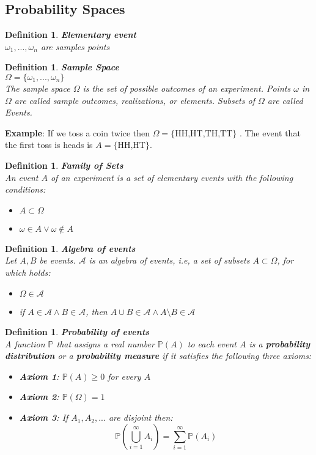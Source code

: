 \documentclass[twoside]{article}
\newtheorem{definition}[theorem]{Definition}
\begin{document}
\subsection{Probability Spaces}
\begin{definition} \textbf{Elementary event}\\
$\omega_1,...,\omega_n$ are samples points
\end{definition}
\begin{definition} \textbf{Sample Space}\\
$\Omega = \{\omega_1,...,\omega_n\}$\\
The sample space $\Omega$ is the set of possible outcomes of an experiment. Points $\omega$ in $\Omega$ are called sample outcomes, realizations, or elements. Subsets of $\Omega$ are called Events.
\end{definition}
\textbf{Example}: If we toss a coin twice then $\Omega = \text{\{HH,HT,TH,TT\}} $ . The event that the first toss is heads is $A = \text{\{HH,HT\}}$.
\begin{definition} \textbf{Family of Sets}\\
An event $A$ of an experiment is a set of elementary events with the following conditions:
\begin{itemize}
    \item $A \subset \Omega$
    \item $\omega \in A \vee \omega \not\in A$
\end{itemize}
\end{definition}
\begin{definition} \textbf{Algebra of events}\\
Let $A, B$ be events. $\mathcal{A}$ is an algebra of events, i.e, a set of subsets $A \subset \Omega$, for which holds:
\begin{itemize}
    \item $\Omega \in \mathcal{A}$
    \item if $A \in \mathcal{A} \wedge B \in \mathcal{A}$, then $A \cup B \in \mathcal{A} \wedge A \setminus B \in \mathcal{A}$
\end{itemize}
\end{definition}
\begin{definition} \textbf{Probability of events}\\
A function $\mathbb{P}$ that assigns a real number $\mathbb{P}(A)$ to each event $A$ is a \textbf{probability distribution} or a \textbf{probability measure} if it satisfies the following three axioms:
\begin{itemize}
    \item \textbf{Axiom 1}: $\mathbb{P}(A) \geq 0$ for every $A$
    \item \textbf{Axiom 2}: $\mathbb{P}(\Omega) = 1$
    \item \textbf{Axiom 3}: If $A_1, A_2,...$ are disjoint then:
    \begin{equation*}
        \mathbb{P}(\bigcup\limits_{i=1}^{\infty} A_i) = \sum\limits_{i=1}^{\infty} \mathbb{P}(A_i)
    \end{equation*}
\end{itemize}
\end{definition}
\end{document}
